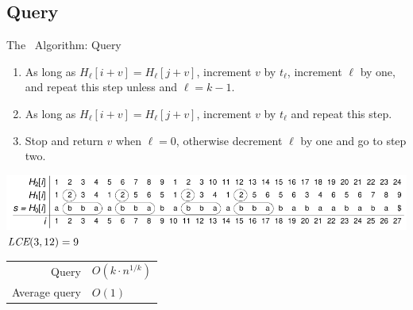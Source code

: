 \documentclass{beamer}
\begin{document}
\subsection{Query}
\begin{frame}{The \fprintk\ Algorithm: Query}
    \begin{enumerate}
        \item As long as $H_\ell[i+v] = H_\ell[j+v]$, increment $v$ by $t_\ell$, increment $\ell$ by one, and repeat this step unless and $\ell = k-1$.
        \item As long as $H_\ell[i+v] = H_\ell[j+v]$, increment $v$ by $t_\ell$ and repeat this step.
        \item Stop and return $v$ when $\ell = 0$, otherwise decrement $\ell$ by one and go to step two.
    \end{enumerate}
    \begin{center}
        \includegraphics[width=1\textwidth,page=2]{../doc/fingerprint.pdf}\\
         $\textit{LCE}(3,12)=9$
    \end{center}
    \begin{tabular}{r l}
        Query & $O(k\cdot n^{1/k})$ \\
        Average query & $O(1)$ \\
    \end{tabular}
\end{frame}
\end{document}
